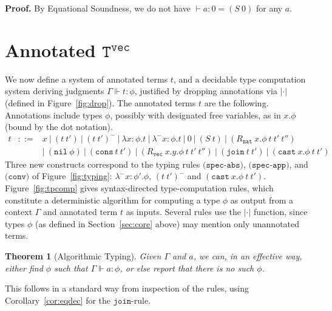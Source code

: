 \documentclass[copyright]{eptcs}
\newtheorem{theorem}{Theorem}
\newcommand{\vc}[0]{\texttt{vec}}
\newcommand{\nat}[0]{\texttt{nat}}
\newcommand{\Tvec}[0]{\texttt{T}^\vc}
\newcommand{\nil}[0]{\texttt{nil}}
\newcommand{\cons}[0]{\texttt{cons}}
\newcommand{\join}[0]{\texttt{join}}
\newcommand{\cast}[0]{\texttt{cast}}
\newcommand{\drop}[1]{| #1 |}
\begin{document}
\noindent \textbf{Proof.} By Equational Soundness, we do not have $\vdash a:0 = (S\ 0)$ for any $a$.

\section{Annotated $\Tvec$}
\label{sec:tvec}

We now define a system of annotated terms $t$, and a decidable type
computation system deriving judgments $\Gamma \Vdash t:\phi$,
justified by dropping annotations via $\drop{\cdot}$ (defined in
Figure~\ref{fig:drop}).  The annotated terms $t$ are the following.
Annotations include types $\phi$, possibly with designated free
variables, as in $x.\phi$ (bound by the dot notation).
\[
\begin{array}{lll}
 t & ::= & x\ |\ (t\ t')\ |\ (t\ t')^-\ |\ \lambda x:\phi.t\ |\ \lambda^- x:\phi.t\ |\ 0\ |\ (S\ t)\ |\ (R_\nat\ x.\phi\ t\ t'\ t'') \\
\ & \ & |\ (\nil\ \phi)\ |\ (\cons\ t\ t')\ |\ (R_\vc\ x.y.\phi\ t\ t'\ t'')\ |\ (\join\ t\ t')\ |\ (\cast\ x.\phi\ t\ t') 
\end{array}
\]
\noindent Three new constructs correspond to the typing rules
$\texttt{(spec-abs)}$, $\texttt{(spec-app)}$, and $\texttt{(conv)}$ of
Figure~\ref{fig:typing}: $\lambda^- x:\phi'.\phi$, $(t\ t')^-$ and
$(\cast\ x.\phi\ t\ t')$.  Figure~\ref{fig:tpcomp} gives
syntax-directed type-computation rules, which constitute a
deterministic algorithm for computing a type $\phi$ as output from a
context $\Gamma$ and annotated term $t$ as inputs.  Several rules use
the $\drop{\cdot}$ function, since types $\phi$ (as defined in
Section~\ref{sec:core} above) may mention only unannotated terms.

\begin{comment}
We define $\drop{\cdot}$
independently of typing.  This simplifies the presentation, and means
that we need not worry whether a term is typable or not before we drop
its annotations.  We record the fact that the type-computation rules
constitute an algorithm as a theorem:
\end{comment}

\begin{theorem}[Algorithmic Typing]
Given $\Gamma$ and $a$, we can, in an effective way, either find
$\phi$ such that $\Gamma \Vdash a : \phi$, or else report that there
is no such $\phi$.
\end{theorem}

\noindent This follows in a standard way from inspection of the rules,
using Corollary~\ref{cor:eqdec} for the $\join$-rule.
\end{document}
